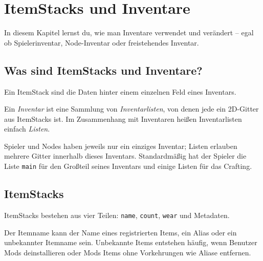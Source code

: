 \chapter{ItemStacks und Inventare}
\label{ch:items/inventories}

In diesem Kapitel lernst du, wie man Inventare
verwendet und verändert -- egal ob Spielerinventar, Node-Inventar oder
freistehendes Inventar.

\section{Was sind ItemStacks und
Inventare?}\label{was-sind-itemstacks-und-inventare}

Ein ItemStack sind die Daten hinter
einem einzelnen Feld eines Inventars.

Ein \emph{Inventar} ist eine Sammlung von \emph{Inventarlisten}, von
denen jede ein 2D-Gitter aus ItemStacks ist. Im Zusammenhang mit
Inventaren heißen Inventarlisten einfach \emph{Listen}.

Spieler und Nodes haben jeweils nur ein einziges Inventar; Listen
erlauben mehrere Gitter innerhalb dieses Inventars. Standardmäßig hat
der Spieler die Liste \texttt{main} für den Großteil seines Inventars
und einige Listen für das Crafting.

\section{ItemStacks}\label{itemstacks}

ItemStacks bestehen aus vier Teilen: \texttt{name}, \texttt{count},
\texttt{wear} und Metadaten.

Der Itemname kann der Name eines registrierten Items, ein
Alias oder ein unbekannter Itemname sein. Unbekannte
Items entstehen häufig, wenn Benutzer Mods deinstallieren oder Mods
Items ohne Vorkehrungen wie Aliase entfernen.

\begin{Shaded}
\begin{Highlighting}[]
\OperatorTok{(}\OperatorTok{:}\OperatorTok{())}
\OperatorTok{:}\OperatorTok{(}\OperatorTok{)}

  \OperatorTok{:}\OperatorTok{()} 
    \OperatorTok{(}\OperatorTok{)}
\end{Highlighting}
\end{Shaded}


